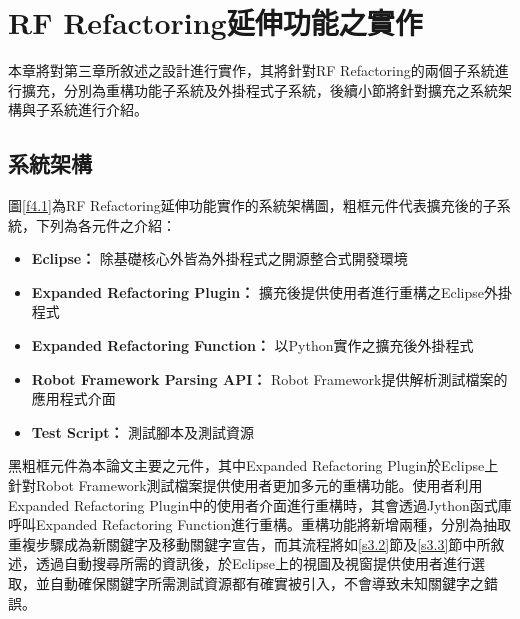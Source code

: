 \chapter{RF Refactoring延伸功能之實作}
\indent
本章將對第三章所敘述之設計進行實作，其將針對RF Refactoring的兩個子系統進行擴充，分別為重構功能子系統及外掛程式子系統，後續小節將針對擴充之系統架構與子系統進行介紹。

\section{系統架構}\label{s4.1}
\indent
圖\ref{f4.1}為RF Refactoring延伸功能實作的系統架構圖，粗框元件代表擴充後的子系統，下列為各元件之介紹：

\begin{itemize}

\item\textbf{Eclipse：}
除基礎核心外皆為外掛程式之開源整合式開發環境

\item\textbf{Expanded Refactoring Plugin：}
擴充後提供使用者進行重構之Eclipse外掛程式

\item\textbf{Expanded Refactoring Function：}
以Python實作之擴充後外掛程式

\item\textbf{Robot Framework Parsing API：}
Robot Framework提供解析測試檔案的應用程式介面

\item\textbf{Test Script：}
測試腳本及測試資源

\end{itemize}

\indent
黑粗框元件為本論文主要之元件，其中Expanded Refactoring Plugin於Eclipse上針對Robot Framework測試檔案提供使用者更加多元的重構功能。使用者利用Expanded Refactoring Plugin中的使用者介面進行重構時，其會透過Jython函式庫呼叫Expanded Refactoring Function進行重構。重構功能將新增兩種，分別為抽取重複步驟成為新關鍵字及移動關鍵字宣告，而其流程將如\ref{s3.2}節及\ref{s3.3}節中所敘述，透過自動搜尋所需的資訊後，於Eclipse上的視圖及視窗提供使用者進行選取，並自動確保關鍵字所需測試資源都有確實被引入，不會導致未知關鍵字之錯誤。

